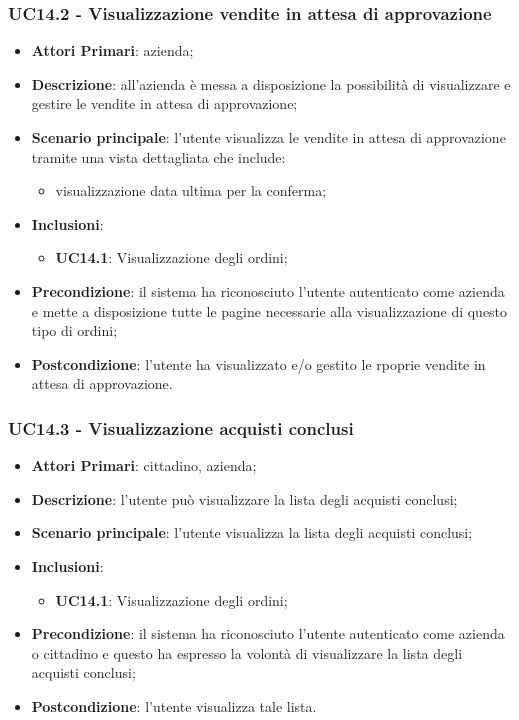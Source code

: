 \subsubsection{UC14.2 - Visualizzazione vendite in attesa di approvazione}
\begin{itemize}
	\item \textbf{Attori Primari}: azienda;
	\item \textbf{Descrizione}: all'azienda è messa a disposizione la possibilità di visualizzare e gestire le vendite in attesa di approvazione;
	\item \textbf{Scenario principale}: l'utente visualizza le vendite in attesa di approvazione tramite una vista dettagliata che include: 
		\begin{itemize}
		\item visualizzazione data ultima per la conferma;
	\end{itemize}
		\item \textbf{Inclusioni}:
	\begin{itemize}
		\item \textbf{UC14.1}: Visualizzazione degli ordini;
	\end{itemize}
	\item \textbf{Precondizione}: il sistema ha riconosciuto l'utente autenticato come azienda e mette a disposizione tutte le pagine necessarie alla visualizzazione di questo tipo di ordini;
	\item \textbf{Postcondizione}: l'utente ha visualizzato e/o gestito le rpoprie vendite in attesa di approvazione.
\end{itemize} 

\subsubsection{UC14.3 - Visualizzazione acquisti conclusi}
\begin{itemize}
	\item \textbf{Attori Primari}: cittadino, azienda;
	\item \textbf{Descrizione}: l'utente può visualizzare la lista degli acquisti conclusi;
	\item \textbf{Scenario principale}: l'utente visualizza la lista degli acquisti conclusi;
	\item \textbf{Inclusioni}:
	\begin{itemize}
		\item \textbf{UC14.1}: Visualizzazione degli ordini;
	\end{itemize}
	\item \textbf{Precondizione}: il sistema ha riconosciuto l'utente autenticato come azienda o cittadino e questo ha espresso la volontà di visualizzare la lista degli acquisti conclusi;
	\item \textbf{Postcondizione}: l'utente visualizza tale lista.
\end{itemize}

